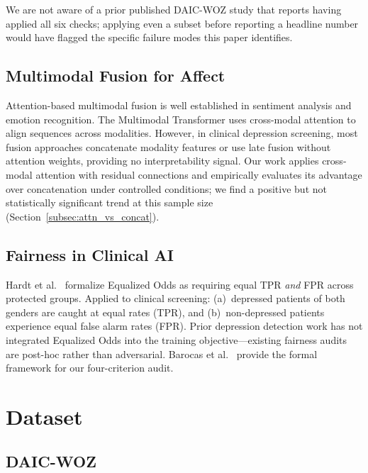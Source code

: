 \documentclass[5p,twocolumn]{elsarticle}
\begin{document}
We are not aware of a prior published DAIC-WOZ study that reports
having applied all six checks; applying even a subset before
reporting a headline number would have flagged the specific failure
modes this paper identifies.

\subsection{Multimodal Fusion for Affect}

Attention-based multimodal fusion is well established in sentiment
analysis \cite{tsai2019multimodal} and emotion recognition. The
Multimodal Transformer \cite{tsai2019multimodal} uses cross-modal
attention to align sequences across modalities. However, in clinical
depression screening, most fusion approaches concatenate modality
features \cite{williamson2016} or use late fusion without attention
weights, providing no interpretability signal. Our work applies
cross-modal attention with residual connections and empirically
evaluates its advantage over concatenation under controlled
conditions; we find a positive but not statistically significant
trend at this sample size (Section~\ref{subsec:attn_vs_concat}).

\subsection{Fairness in Clinical AI}

Hardt et al.\ \cite{hardt2016} formalize Equalized Odds as requiring
equal TPR \emph{and} FPR across protected groups. Applied to clinical
screening: (a)~depressed patients of both genders are caught at equal
rates (TPR), and (b)~non-depressed patients experience equal false
alarm rates (FPR). Prior depression detection work has not integrated
Equalized Odds into the training objective---existing fairness audits
are post-hoc rather than adversarial. Barocas et al.\ \cite{barocas2019}
provide the formal framework for our four-criterion audit.

\section{Dataset}
\label{sec:dataset}

\subsection{DAIC-WOZ}
\end{document}
